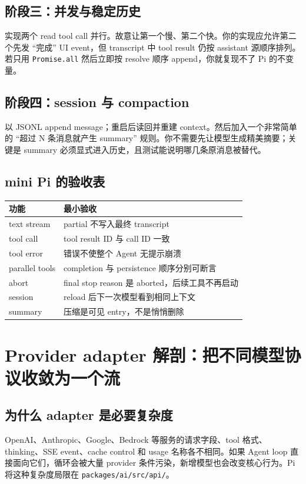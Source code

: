 \documentclass[UTF8,openany,11pt]{ctexbook}
\newcommand{\pathref}[1]{\texttt{#1}}
\begin{document}
\section{阶段三：并发与稳定历史}
实现两个 read tool call 并行。故意让第一个慢、第二个快。你的实现应允许第二个先发 ``完成'' UI event，但 transcript 中 tool result 仍按 assistant 源顺序排列。若只用 \texttt{Promise.all} 然后立即按 resolve 顺序 append，你就复现不了 Pi 的不变量。

\section{阶段四：session 与 compaction}
以 JSONL append message；重启后读回并重建 context。然后加入一个非常简单的 ``超过 N 条消息就产生 summary'' 规则。你不需要先让模型生成精美摘要；关键是 summary 必须显式进入历史，且测试能说明哪几条原消息被替代。

\section{mini Pi 的验收表}
\begin{longtable}{p{}p{}}
\toprule
功能 & 最小验收\\
\midrule
text stream & partial 不写入最终 transcript\\
tool call & tool result ID 与 call ID 一致\\
tool error & 错误不使整个 Agent 无提示崩溃\\
parallel tools & completion 与 persistence 顺序分别可断言\\
abort & final stop reason 是 aborted，后续工具不再启动\\
session & reload 后下一次模型看到相同上下文\\
summary & 压缩是可见 entry，不是悄悄删除\\
\bottomrule
\end{longtable}

\chapter{Provider adapter 解剖：把不同模型协议收敛为一个流}

\section{为什么 adapter 是必要复杂度}
OpenAI、Anthropic、Google、Bedrock 等服务的请求字段、tool 格式、thinking、SSE event、cache control 和 usage 名称各不相同。如果 Agent loop 直接面向它们，循环会被大量 provider 条件污染，新增模型也会改变核心行为。Pi 将这种复杂度局限在 \pathref{packages/ai/src/api/}。
\end{document}
